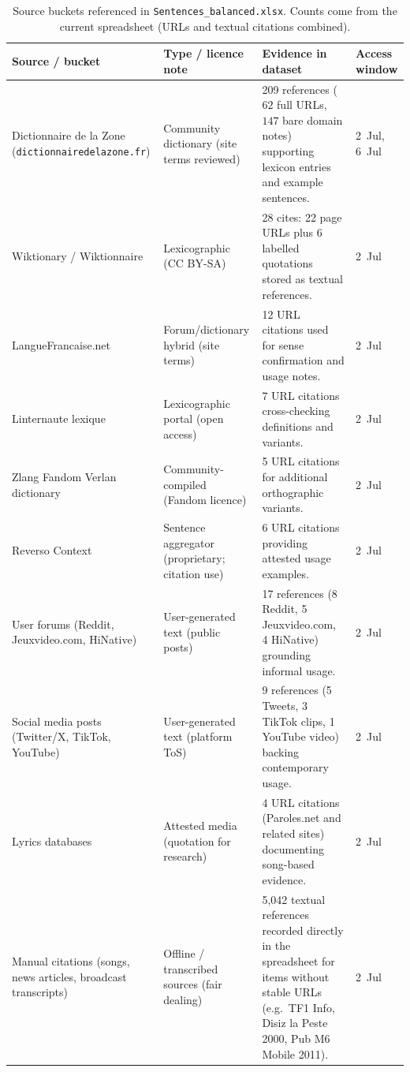 \documentclass[12pt]{article}
\begin{document}
\begin{table}[H]
\centering
\caption{Source buckets referenced in \texttt{Sentences\_balanced.xlsx}. Counts come from the current spreadsheet (URLs and textual citations combined).}
\begin{tabular}{p{4.4cm} p{2.8cm} p{5.8cm} p{1.8cm}}
\hline
\textbf{Source / bucket} & \textbf{Type / licence note} & \textbf{Evidence in dataset} & \textbf{Access window} \\
\hline
Dictionnaire de la Zone (\texttt{dictionnairedelazone.fr}) & Community dictionary (site terms reviewed) & 209 references (\(62\) full URLs, \(147\) bare domain notes) supporting lexicon entries and example sentences. & 2~Jul, 6~Jul \\
Wiktionary / Wiktionnaire & Lexicographic (CC BY-SA) & 28 cites: 22 page URLs plus 6 labelled quotations stored as textual references. & 2~Jul \\
LangueFrancaise.net & Forum/dictionary hybrid (site terms) & 12 URL citations used for sense confirmation and usage notes. & 2~Jul \\
Linternaute lexique & Lexicographic portal (open access) & 7 URL citations cross-checking definitions and variants. & 2~Jul \\
Zlang Fandom Verlan dictionary & Community-compiled (Fandom licence) & 5 URL citations for additional orthographic variants. & 2~Jul \\
Reverso Context & Sentence aggregator (proprietary; citation use) & 6 URL citations providing attested usage examples. & 2~Jul \\
User forums (Reddit, Jeuxvideo.com, HiNative) & User-generated text (public posts) & 17 references (8 Reddit, 5 Jeuxvideo.com, 4 HiNative) grounding informal usage. & 2~Jul \\
Social media posts (Twitter/X, TikTok, YouTube) & User-generated text (platform ToS) & 9 references (5 Tweets, 3 TikTok clips, 1 YouTube video) backing contemporary usage. & 2~Jul \\
Lyrics databases & Attested media (quotation for research) & 4 URL citations (Paroles.net and related sites) documenting song-based evidence. & 2~Jul \\
Manual citations (songs, news articles, broadcast transcripts) & Offline / transcribed sources (fair dealing) & 5{,}042 textual references recorded directly in the spreadsheet for items without stable URLs (e.g.\ TF1 Info, Disiz la Peste 2000, Pub M6 Mobile 2011). & 2~Jul \\
\hline
\end{tabular}
\label{tab:source-inventory}
\end{table}
\end{document}

